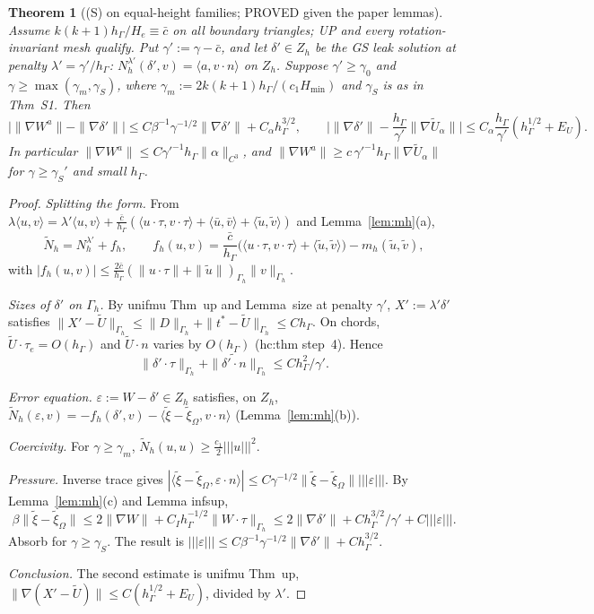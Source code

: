 \documentclass[11pt]{article}
\newtheorem{theorem}{Theorem}[section]
\theoremstyle{remark}
\newcommand{\hG}{h_\Gamma}
\newcommand{\Gh}{\Gamma_h}
\newcommand{\ip}[2]{\langle #1,#2\rangle}
\newcommand{\tn}[1]{|\!|\!|#1|\!|\!|}
\begin{document}
\begin{theorem}[(S) on equal-height families; PROVED given the paper lemmas]\label{thm:Seq}
Assume $k(k+1)\hG/H_e\equiv\bar c$ on all boundary triangles; \textsf{UP} and every rotation-invariant mesh qualify. Put $\gamma':=\gamma-\bar c$, and let $\delta'\in Z_h$ be the GS leak solution
at penalty $\lambda'=\gamma'/\hG$: $N_h^{\lambda'}(\delta',v)=\ip a{v\cdot n}$ on $Z_h$. Suppose $\gamma'\ge\gamma_0$ and
$\gamma\ge\max(\gamma_m,\gamma_S)$, where $\gamma_m:=2k(k+1)\hG/(c_1H_{\min})$ and $\gamma_S$ is as in Thm~S1. Then
\[
\big|\|\nabla W^a\|-\|\nabla\delta'\|\big|\le C\beta^{-1}\gamma^{-1/2}\|\nabla\delta'\|+C_\alpha\hG^{3/2},\qquad
\Big|\|\nabla\delta'\|-\frac{\hG}{\gamma'}\|\nabla\tilde U_\alpha\|\Big|\le C_\alpha\frac{\hG}{\gamma'}(\hG^{1/2}+E_U).
\]
In particular $\|\nabla W^a\|\le C\gamma'^{-1}\hG\|\alpha\|_{C^3}$, and $\|\nabla W^a\|\ge c\,\gamma'^{-1}\hG\|\nabla\tilde U_\alpha\|$ for $\gamma\ge\gamma_S'$ and small $\hG$.
\end{theorem}
\begin{proof}
\emph{Splitting the form.} From $\lambda\ip uv=\lambda'\ip uv+\frac{\bar c}{\hG}(\ip{u\cdot\tau}{v\cdot\tau}+\ip{\bar u}{\bar v}+\ip{\tilde u}{\tilde v})$ and
Lemma~\ref{lem:mh}(a),
\[
\tilde N_h=N_h^{\lambda'}+f_h,\qquad f_h(u,v)=\frac{\bar c}{\hG}\big(\ip{u\cdot\tau}{v\cdot\tau}+\ip{\tilde u}{\tilde v}\big)-m_h(\tilde u,\tilde v),
\]
with $|f_h(u,v)|\le\frac{2\bar c}{\hG}(\|u\cdot\tau\|+\|\tilde u\|)_{\Gh}\|v\|_{\Gh}$.

\emph{Sizes of $\delta'$ on $\Gh$.} By unifmu Thm~up and Lemma~size at penalty $\gamma'$, $X':=\lambda'\delta'$ satisfies
$\|X'-\tilde U\|_{\Gh}\le\|D\|_{\Gh}+\|t^\ast-\tilde U\|_{\Gh}\le C\hG$. On chords, $\tilde U\cdot\tau_e=O(\hG)$ and $\tilde U\cdot n$ varies by $O(\hG)$ (hc:thm step~4). Hence
\[
\|\delta'\cdot\tau\|_{\Gh}+\|\widetilde{\delta'\cdot n}\|_{\Gh}\le C\hG^2/\gamma' .
\]

\emph{Error equation.} $\varepsilon:=W-\delta'\in Z_h$ satisfies, on $Z_h$, $\tilde N_h(\varepsilon,v)=-f_h(\delta',v)-\ip{\tilde\xi-\tilde\xi_\Omega}{v\cdot n}$ (Lemma~\ref{lem:mh}(b)).

\emph{Coercivity.} For $\gamma\ge\gamma_m$, $\tilde N_h(u,u)\ge\frac{c_1}2\tn u^2$.

\emph{Pressure.} Inverse trace gives $|\ip{\tilde\xi-\tilde\xi_\Omega}{\varepsilon\cdot n}|\le C\gamma^{-1/2}\|\tilde\xi-\tilde\xi_\Omega\|\tn\varepsilon$. By Lemma~\ref{lem:mh}(c) and
Lemma infsup,
\[
\beta\|\tilde\xi-\tilde\xi_\Omega\|\le2\|\nabla W\|+C_I\hG^{-1/2}\|W\cdot\tau\|_{\Gh}\le2\|\nabla\delta'\|+C\hG^{3/2}/\gamma'+C\tn\varepsilon .
\]
Absorb for $\gamma\ge\gamma_S$. The result is $\tn\varepsilon\le C\beta^{-1}\gamma^{-1/2}\|\nabla\delta'\|+C\hG^{3/2}$.

\emph{Conclusion.} The second estimate is unifmu Thm~up, $\|\nabla(X'-\tilde U)\|\le C(\hG^{1/2}+E_U)$, divided by $\lambda'$.
\end{proof}
\end{document}
